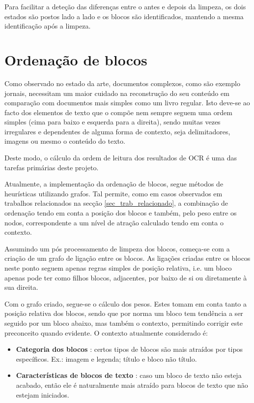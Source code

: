 Para facilitar a deteção das diferenças entre o antes e depois da limpeza, os dois estados são postos lado a lado e os blocos são identificados, mantendo a mesma identificação após a limpeza. 



\section{Ordenação de blocos}
\label{ordenacao_blocos}

Como observado no estado da arte, documentos complexos, como são exemplo jornais, necessitam um maior cuidado na reconstrução do seu conteúdo em comparação com documentos mais simples como um livro regular. Isto deve-se ao facto dos elementos de texto que o compõe nem sempre seguem uma ordem simples (cima para baixo e esquerda para a direita), sendo muitas vezes irregulares e dependentes de alguma forma de contexto, seja delimitadores, imagens ou mesmo o conteúdo do texto.

Deste modo, o cálculo da ordem de leitura dos resultados de OCR é uma das tarefas primárias deste projeto.

Atualmente, a implementação da ordenação de blocos, segue métodos de heurísticas utilizando grafos. Tal permite, como em casos observados em trabalhos relacionados na secção  \ref{sec_trab_relacionado}, a combinação de ordenação tendo em conta a posição dos blocos e também, pelo peso entre os nodos, correspondente a um nível de atração calculado tendo em conta o contexto.

Assumindo um pós processamento de limpeza dos blocos, começa-se com a criação de um grafo de ligação entre os blocos. As ligações criadas entre os blocos neste ponto seguem apenas regras simples de posição relativa, i.e. um bloco apenas pode ter como filhos blocos, adjacentes, por baixo de si ou diretamente à sua direita.

Com o grafo criado, segue-se o cálculo dos pesos. Estes tomam em conta tanto a posição relativa dos blocos, sendo que por norma um bloco tem tendência a ser seguido por um bloco abaixo, mas também o contexto, permitindo corrigir este preconceito quando evidente. O contexto atualmente considerado é:
\begin{itemize}
    \item \textbf{Categoria dos blocos} : certos tipos de blocos são mais atraídos por tipos específicos. Ex.: imagem e legenda; título e bloco não título.
    \item \textbf{Características de blocos de texto} : caso um bloco de texto não esteja acabado, então ele é naturalmente mais atraído para blocos de texto que não estejam iniciados.
\end{itemize}

